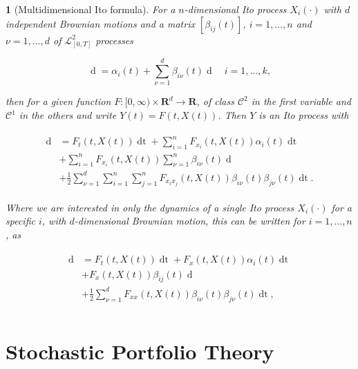 \documentclass[british]{amsart} \usepackage{lmodern}
\numberwithin{equation}{section} \numberwithin{figure}{section}
\theoremstyle{plain} \newtheorem{thm}{\protect\theoremname}[section]
\theoremstyle{definition} \newtheorem{defn}[thm]{\protect\definitionname}
\theoremstyle{plain} \newtheorem{assumption}[thm]{\protect\assumptionname}
\theoremstyle{plain} \newtheorem{lem}[thm]{\protect\lemmaname}
\theoremstyle{plain} \newtheorem{prop}[thm]{\protect\propositionname}
\theoremstyle{remark} \newtheorem{rem}[thm]{\protect\remarkname}
\theoremstyle{plain} \newtheorem{cor}[thm]{\protect\corollaryname}
\renewcommand{\d}[1]{\mathop{\mathrm{d}{#1}}}
\newcommand{\rangei}{i=1,\dots,n} \newcommand{\measure}{\mathbb{P}}
\begin{document}
\begin{thm} [Multidimensional Ito formula]

  For a $n$-dimensional Ito process $X_{i}(\cdot)$ with $d$ independent Brownian motions and a
  matrix $[\beta_{ij}(t)]$, $i=1,\dots,n$ and $\nu=1,\dots,d$ of $\mathcal{L}_{[0,T]}^{2}$ processes

  \begin{equation}
    \d{X_{i}(t)} = \alpha_i(t) + \sum_{\nu=1}^d \beta_{i\nu}(t)\d{W_{\nu}(t)}
    \quad i=1,\dots,k,
  \end{equation}

  then for a given function $F:[0,\infty) \times \mathbf{R}^d \to \mathbf{R}$, of
  class $\mathcal{C}^2$ in the first variable and $\mathcal{C}^1$ in the others
  and write $Y(t)=F(t,X(t))$. Then $Y$ is an Ito process with

   \begin{gather}
    \begin{split}
    \d{Y(t)} &= F_{t}(t, X(t))\d{t} + \sum_{i=1}^n F_{x_{i}}(t,X(t)) \alpha_{i}(t)\d{t} \\
             & + \sum_{i=1}^n F_{x_{i}}(t,X(t)) \sum_{\nu=1}^n \beta_{i\nu}(t)\d{W_{\nu}(t)} \\
             & + \frac{1}{2} \sum_{\nu=1}^d \sum_{i=1}^n \sum_{j=1}^n
                  F_{x_{i}x_{j}}(t,X(t)) \beta_{i\nu}(t) \beta_{j\nu}(t)\d{t}.
    \end{split}
  \end{gather}

  Where we are interested in only the dynamics of a single Ito process
  $X_{i}(\cdot)$ for a specific $i$, with $d$-dimensional Brownian motion, this
  can be written for $\rangei$, as

  \begin{gather}
    \begin{split}
    \d{Y(t)} &= F_{t}(t, X(t))\d{t} + F_{x}(t,X(t)) \alpha_{i}(t)\d{t} \\
             & + F_{x}(t,X(t)) \beta_{ij}(t)\d{W_{j}(t)} \\
             & + \frac{1}{2} \sum_{\nu=1}^d F_{xx}(t,X(t))
                \beta_{i\nu}(t) \beta_{j\nu}(t)\d{t},\\
    \end{split}
  \end{gather}


\end{thm}

\newpage

\section{Stochastic Portfolio Theory}
\end{document}
